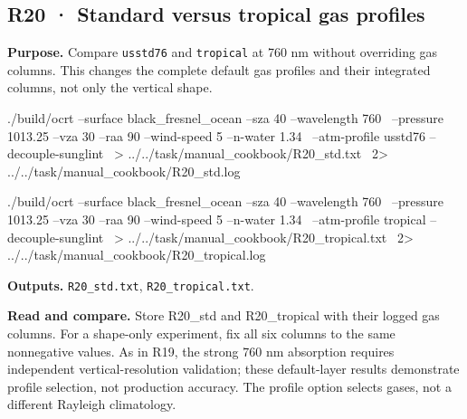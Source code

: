 
\subsection{R20 · Standard versus tropical gas profiles}
\label{sec:auto:09_cookbook:4.5}

\label{recipe:R20}

\textbf{Purpose. }Compare \texttt{usstd76} and \texttt{tropical} at 760 nm without overriding gas columns. This changes the complete default gas profiles and their integrated columns, not only the vertical shape.

\noindent\begin{minipage}{\linewidth}
\begin{ManualCode}

./build/ocrt --surface black_fresnel_ocean --sza 40 --wavelength 760 \
  --pressure 1013.25 --vza 30 --raa 90 --wind-speed 5 --n-water 1.34 \
  --atm-profile usstd76 --decouple-sunglint \
  > ../../task/manual_cookbook/R20_std.txt \
  2> ../../task/manual_cookbook/R20_std.log

\end{ManualCode}
\end{minipage}\par

\noindent\begin{minipage}{\linewidth}
\begin{ManualCode}

./build/ocrt --surface black_fresnel_ocean --sza 40 --wavelength 760 \
  --pressure 1013.25 --vza 30 --raa 90 --wind-speed 5 --n-water 1.34 \
  --atm-profile tropical --decouple-sunglint \
  > ../../task/manual_cookbook/R20_tropical.txt \
  2> ../../task/manual_cookbook/R20_tropical.log

\end{ManualCode}
\end{minipage}\par

\textbf{Outputs. }\texttt{R20\_\allowbreak{}std.txt}, \texttt{R20\_\allowbreak{}tropical.txt}.

\textbf{Read and compare. }Store R20\_std and R20\_tropical with their logged gas columns. For a shape-only experiment, fix all six columns to the same nonnegative values. As in R19, the strong 760 nm absorption requires independent vertical-resolution validation; these default-layer results demonstrate profile selection, not production accuracy. The profile option selects gases, not a different Rayleigh climatology.

